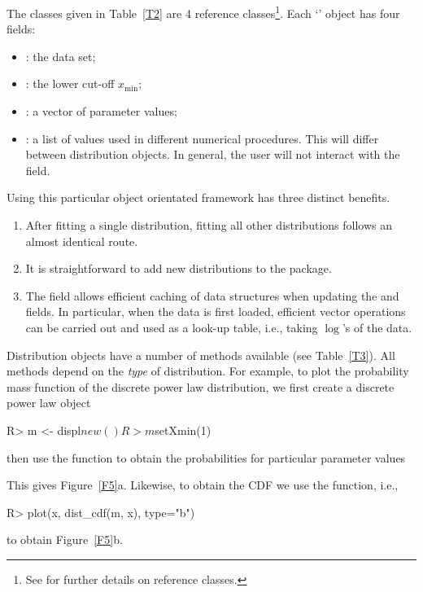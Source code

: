 \documentclass[article]{jss}
\newcommand{\xmin}{x_{\min}}
\begin{document}
The classes given in Table~\ref{T2} are 4 reference
classes\footnote{See  for further details on
  reference classes.}. Each `' object has four fields:
\begin{itemize}
\item {}: the data set;
\item {}: the lower cut-off $\xmin$;
\item {}: a vector of parameter values;
\item {}: a list of values used in different numerical
  procedures. This will differ between distribution objects. In general, the
  user will not interact with the  field.
\end{itemize}
Using this particular object orientated framework has three distinct benefits. 
\begin{enumerate}
\item After fitting a single distribution, fitting all other distributions
  follows an almost identical route.
\item It is straightforward to add new distributions to the package.
\item The  field allows efficient caching of data structures when
  updating the  and  fields. In particular, when the data is
  first loaded, efficient vector operations can be carried out and used as a
  look-up table, i.e., taking $\log$'s of the data.
\end{enumerate}
Distribution objects have a number of methods available (see Table~\ref{T3}).
All  methods depend on the \textit{type} of distribution. For
example, to plot the probability mass function of the discrete power law
distribution, we first create a discrete power law object
\begin{Schunk}
\begin{Sinput}
R> m <- displ$new()
R> m$setXmin(1)
\end{Sinput}
\end{Schunk}
then use the  function to obtain the probabilities for particular
parameter values
\begin{Schunk}
\end{Schunk}
This gives Figure~\ref{F5}a. Likewise, to obtain the CDF we use the
 function, i.e.,
\begin{Schunk}
\begin{Sinput}
R> plot(x, dist_cdf(m, x), type="b")
\end{Sinput}
\end{Schunk}
to obtain Figure~\ref{F5}b.
\end{document}

